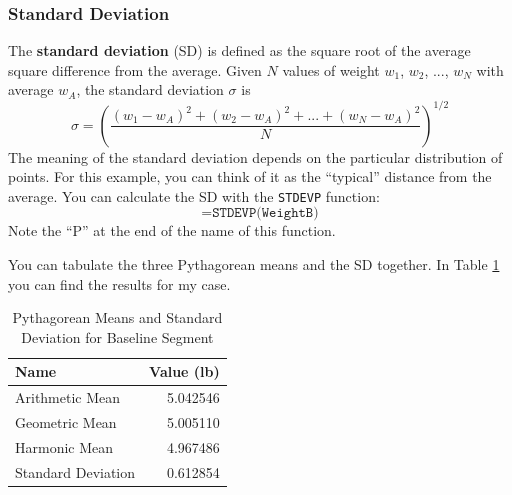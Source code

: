 \subsubsection{Standard Deviation}
The \textbf{standard deviation} (SD) is defined as the square root of the average square difference from the average. Given $N$ values of weight $w_{1}$, $w_{2}$, ..., $w_{N}$ with average $w_{A}$, the standard deviation $\sigma$ is
\begin{equation}
    \sigma = \left( \frac{(w_{1} - w_{A})^{2} + (w_{2} - w_{A})^{2} + ... + (w_{N} - w_{A})^{2}}{N}  \right)^{1/2}
\end{equation}
The meaning of the standard deviation depends on the particular distribution of points. For this example, you can think of it as the ``typical'' distance from the average. You can calculate the SD with the \texttt{STDEVP} function:
\begin{equation}
    \texttt{=STDEVP(WeightB)}
\end{equation}
Note the ``P'' at the end of the name of this function.

You can tabulate the three Pythagorean means and the SD together. In Table \ref{table:00.baseline.means} you can find the results for my case.
\begin{table}
    \centering
	\begin{tabular}{|l|r|} \hline
		\textbf{Name} & \textbf{Value (lb)} \\
        \hline
		Arithmetic Mean & 5.042546 \\
		Geometric Mean & 5.005110 \\
        Harmonic Mean & 4.967486 \\
        \hline
        Standard Deviation & 0.612854 \\
		\hline
	\end{tabular}
    \caption{Pythagorean Means and Standard Deviation for Baseline Segment}
    \label{table:00.baseline.means}
\end{table}
